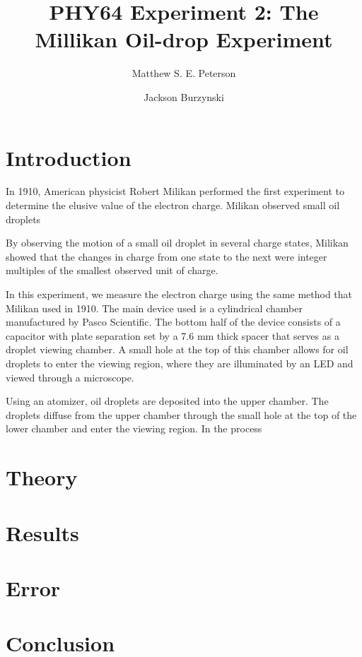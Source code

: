 \documentclass[aps, reprint,amsmath,amssymb]{revtex4-1} %
\begin{document}
\title{PHY64 Experiment 2: The Millikan Oil-drop Experiment}
\author{Matthew S. E. Peterson}
\author{Jackson Burzynski}
\maketitle

\section{Introduction}

In 1910, American physicist Robert Milikan performed the first experiment to determine the elusive value of the electron charge. Milikan observed small oil droplets


 By observing the motion of a small oil droplet in several charge states, Milikan showed that the changes in charge from one state to the next were integer multiples of the smallest observed unit of charge.

In this experiment, we measure the electron charge using the same method that Milikan used in 1910. The main device used is a cylindrical chamber manufactured by Pasco Scientific. The bottom half of the device consists of a capacitor with plate separation set by a 7.6 mm thick spacer that serves as a droplet viewing chamber. A small hole at the top of this chamber allows for oil droplets to enter the viewing region, where they are illuminated by an LED and viewed through a microscope.

Using an atomizer, oil droplets are deposited into the upper chamber. The droplets diffuse from the upper chamber through the small hole at the top of the lower chamber and enter the viewing region. In the process 


\section{Theory}


\section{Results}


\section{Error}

\section{Conclusion}
\end{document}

